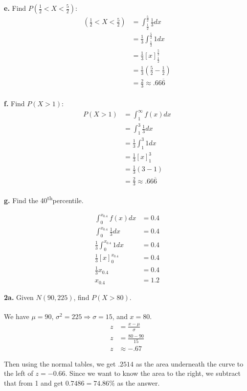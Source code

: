 \documentclass[12pt]{report}
\newcommand{\thn}{\textsuperscript{th}}
\begin{document}
\pagebreak

\noindent \textbf{e.} Find $P(\frac{1}{2} < X < \frac{5}{2})$:
\begin{align*}
(\frac{1}{2} < X < \frac{5}{2}) &= \int_{\frac{1}{2}}^{\frac{5}{2}}\frac{1}{3}dx\\
&= \frac{1}{3}\int_{\frac{1}{2}}^{\frac{5}{2}}1dx\\
&= \frac{1}{3}\left[x\right]_{\frac{1}{2}}^{\frac{5}{2}}\\
&= \frac{1}{3}\left(\frac{5}{2} - \frac{1}{2}\right)\\
&= \boxed{\frac{2}{3} \approx .66\overline{6}}\\
\end{align*}

\noindent \textbf{f.} Find $P(X > 1)$:
\begin{align*}
P(X > 1) &= \int_1^{\infty}f(x)dx\\
&= \int_{1}^{3}\frac{1}{3}dx\\
&= \frac{1}{3}\int_{1}^{3}1dx\\
&= \frac{1}{3}\left[x\right]_1^3\\
&= \frac{1}{3}(3-1)\\
&= \boxed{\frac{2}{3} \approx .66\overline{6}}
\end{align*}

\pagebreak

\noindent \textbf{g.} Find the 40\thn percentile.

\begin{align*}
\int_{0}^{x_{0.4}}f(x)dx &= 0.4\\
\int_{0}^{x_{0.4}}\frac{1}{3}dx &= 0.4\\
\frac{1}{3}\int_{0}^{x_{0.4}}1dx &= 0.4\\
\frac{1}{3}[x]_0^{x_{0.4}} &= 0.4\\
\frac{1}{3}x_{0.4} &= 0.4\\
x_{0.4} &= \boxed{1.2}
\end{align*}

\noindent \textbf{2a.} Given $N(90, 225)$, find $P(X > 80)$.\\\\
\noindent We have $\mu = 90$, $\sigma^2=225 \Rightarrow \sigma = 15$, and $x = 80$.
\begin{align*}
z &= \frac{x - \mu}{\sigma}\\
z &= \frac{80 - 90}{15}\\
z &\approx -.67
\end{align*}

\noindent Then using the normal tables, we get $.2514$ as the area underneath the curve to the left of $z = -0.66$. Since we want to know the area to the right, we subtract that from 1 and get $\boxed{0.7486} = 74.86\%$ as the answer.\\
\end{document}

